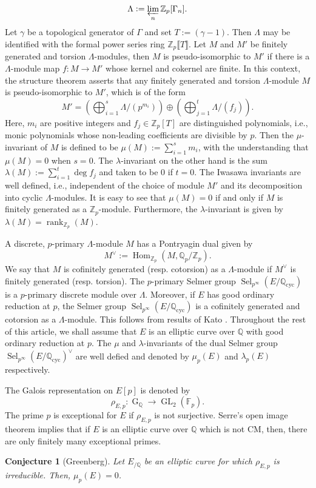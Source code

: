 \documentclass[12pt]{amsart}
\newtheorem{conjecture}[theorem]{Conjecture}
\newcommand{\Z}{\mathbb{Z}}
\newcommand{\Q}{\mathbb{Q}}
\newcommand{\F}{\mathbb{F}}
\newcommand{\op}[1]{\operatorname{#1}}
\numberwithin{equation}{section}
\begin{document}
\[\Lambda:=\varprojlim_n \Z_p[\Gamma_n].\] Let $\gamma$ be a topological generator of $\Gamma$ and set $T:=(\gamma-1)$. Then $\Lambda$ may be identified with the formal power series ring $\Z_p\llbracket T\rrbracket$. Let $M$ and $M'$ be finitely generated and torsion $\Lambda$-modules, then $M$ is pseudo-isomorphic to $M'$ if there is a $\Lambda$-module map $f: M\rightarrow M'$ whose kernel and cokernel are finite. In this context, the structure theorem \cite[Ch. 13]{washington} asserts that any finitely generated and torsion $\Lambda$-module $M$ is pseudo-isomorphic to $M'$, which is of the form
\[M'=\left(\bigoplus_{i=1}^s \Lambda/(p^{m_i})\right)\oplus \left(\bigoplus_{j=1}^t \Lambda/(f_j)\right).\] Here, $m_i$ are positive integers and $f_j\in \Z_p[T]$ are distinguished polynomials, i.e., monic polynomials whose non-leading coefficients are divisible by $p$. Then the $\mu$-invariant of $M$ is defined to be $\mu(M):=\sum_{i=1}^s m_i$, with the understanding that $\mu(M)=0$ when $s=0$. The $\lambda$-invariant on the other hand is the sum $\lambda(M):=\sum_{i=1}^t \op{deg} f_j$ and taken to be $0$ if $t=0$. The Iwasawa invariants are well defined, i.e., independent of the choice of module $M'$ and its decomposition into cyclic $\Lambda$-modules. It is easy to see that $\mu(M)=0$ if and only if $M$ is finitely generated as a $\Z_p$-module. Furthermore, the $\lambda$-invariant is given by $\lambda(M)=\op{rank}_{\Z_p}(M)$. 

\par A discrete, $p$-primary $\Lambda$-module $M$ has a Pontryagin dual given by \[M^\vee:=\op{Hom}_{\Z_p}\left(M, \Q_p/\Z_p\right).\] We say that $M$ is cofinitely generated (resp. cotorsion) as a $\Lambda$-module if $M^\vee$ is finitely generated (resp. torsion). The $p$-primary Selmer group $\op{Sel}_{p^\infty}(E/\Q_{\op{cyc}})$ is a $p$-primary discrete module over $\Lambda$. Moreover, if $E$ has good ordinary reduction at $p$, the Selmer group $\op{Sel}_{p^\infty}(E/\Q_{\op{cyc}})$ is a cofinitely generated and cotorsion as a $\Lambda$-module. This follows from results of Kato \cite{kato}. Throughout the rest of this article, we shall assume that $E$ is an elliptic curve over $\Q$ with good ordinary reduction at $p$. The $\mu$ and $\lambda$-invariants of the dual Selmer group $\op{Sel}_{p^\infty}(E/\Q_{\op{cyc}})^\vee$ are well defied and denoted by $\mu_p(E)$ and $\lambda_p(E)$ respectively. 

\par The Galois representation on $E[p]$ is denoted by 
\[\rho_{E,p}: \op{G}_{\Q}\rightarrow \op{GL}_2(\F_p).\] The prime $p$ is exceptional for $E$ if $\rho_{E,p}$ is not surjective. Serre's open image theorem implies that if $E$ is an elliptic curve over $\Q$ which is not CM, then, there are only finitely many exceptional primes. 
\begin{conjecture}[Greenberg]
    Let $E_{/\Q}$ be an elliptic curve for which $\rho_{E,p}$ is irreducible. Then, $\mu_p(E)=0$. 
\end{conjecture}
\end{document}
